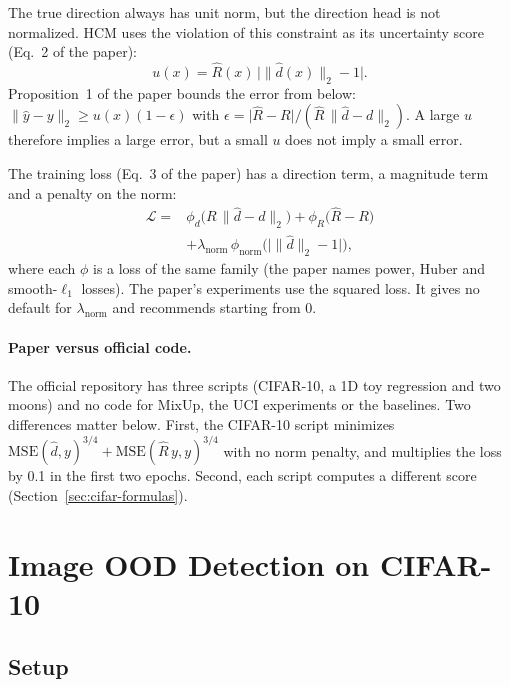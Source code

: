 \documentclass[letterpaper]{article} %
\begin{document}
The true direction always has unit norm, but the direction head is not normalized. HCM uses the violation of this constraint as its uncertainty score (Eq.~2 of the paper):
\begin{equation}
  u(x)=\hat R(x)\,\bigl\lvert\lVert\hat d(x)\rVert_2-1\bigr\rvert .
  \label{eq:score}
\end{equation}
Proposition~1 of the paper bounds the error from below: $\lVert\hat y-y\rVert_2\ge u(x)(1-\epsilon)$ with $\epsilon=\lvert\hat R-R\rvert/(\hat R\,\lVert\hat d-d\rVert_2)$. A large $u$ therefore implies a large error, but a small $u$ does not imply a small error.

The training loss (Eq.~3 of the paper) has a direction term, a magnitude term and a penalty on the norm:
\begin{equation}
\begin{split}
  \mathcal{L}={}&\phi_d\bigl(R\,\lVert\hat d-d\rVert_2\bigr)+\phi_R\bigl(\hat R-R\bigr)\\
  &+\lambda_{\text{norm}}\,\phi_{\text{norm}}\bigl(\bigl\lvert\lVert\hat d\rVert_2-1\bigr\rvert\bigr),
\end{split}
  \label{eq:hcm-loss}
\end{equation}
where each $\phi$ is a loss of the same family (the paper names power, Huber and smooth-$\ell_1$ losses). The paper's experiments use the squared loss. It gives no default for $\lambda_{\text{norm}}$ and recommends starting from 0.

\paragraph{Paper versus official code.} The official repository has three scripts (CIFAR-10, a 1D toy regression and two moons) and no code for MixUp, the UCI experiments or the baselines. Two differences matter below. First, the CIFAR-10 script minimizes $\mathrm{MSE}(\hat d,y)^{3/4}+\mathrm{MSE}(\hat R\,y,y)^{3/4}$ with no norm penalty, and multiplies the loss by 0.1 in the first two epochs. Second, each script computes a different score (Section~\ref{sec:cifar-formulas}).

\section{Image OOD Detection on CIFAR-10}
\label{sec:exp}

\subsection{Setup}
\label{sec:cifar-setup}
\end{document}
